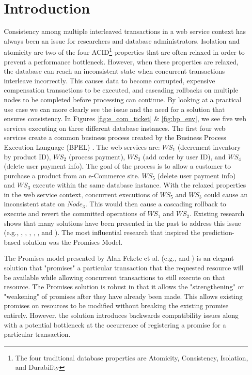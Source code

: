 \section{Introduction}
\label{pbs:introduction}
Consistency among multiple interleaved transactions in a web service context has always been an issue for researchers and database administrators. Isolation and atomicity are two of the four ACID\footnote{The four traditional database properties are Atomicity, Consistency, Isolation, and Durability} properties that are often relaxed in order to prevent a performance bottleneck. However, when these properties are relaxed, the database can reach an inconsistent state when concurrent transactions interleave incorrectly. This causes data to become corrupted, expensive compensation transactions to be executed, and cascading rollbacks on multiple nodes to be completed before processing can continue. By looking at a practical use case we can more clearly see the issue and the need for a solution that ensures consistency. In Figures \ref{fig:e_com_ticket} \& \ref{fig:bp_env}, we see five web services executing on three different database instances. The first four web services  create a common business process created by the Business Process Execution Language (BPEL) \cite{BPEL}. The web services are: $WS_{1}$ (decrement inventory by product ID), $WS_{2}$ (process payment), $WS_{3}$ (add order by user ID), and $WS_{4}$ (delete user payment info). The goal of the process is to allow a customer to purchase a product from an e-Commerce site. $WS_{5}$ (delete user payment info) and $WS_{3}$ execute within the same database instance. With the relaxed properties in the web service context, concurrent executions of $WS_{5}$ and $WS_{3}$ could cause an inconsistent state on $Node_{3}$. This would then cause a cascading rollback to execute and revert the committed operations of $WS_{1}$ and $WS_{2}$. Existing research shows that many solutions have been presented in the past to address this issue (e.g., \cite{Fekete_SnapshotIso}, \cite{Alrifai_Distributed_Managment}, \cite{Fekete_RAMP}, \cite{Fekete_IsolationSupport}, \cite{Jacobi_Locking}, and \cite{Fekete_Promises}). The most influential research that inspired the prediction-based solution was the Promises Model.

The Promises model presented by Alan Fekete et al. (e.g., \cite{Fekete_IsolationSupport} and \cite{Fekete_Promises}) is an elegant solution that "promises" a particular transaction that the requested resource will be available while allowing concurrent transactions to still execute on that resource. The Promises solution is robust in that it allows the "strengthening" or "weakening" of promises after they have already been made. This allows existing promises on resources to be modified without breaking the existing promise entirely. However, the solution introduces backwards compatibility issues along with a potential bottleneck at the occurrence of registering a promise for a particular transaction. 

